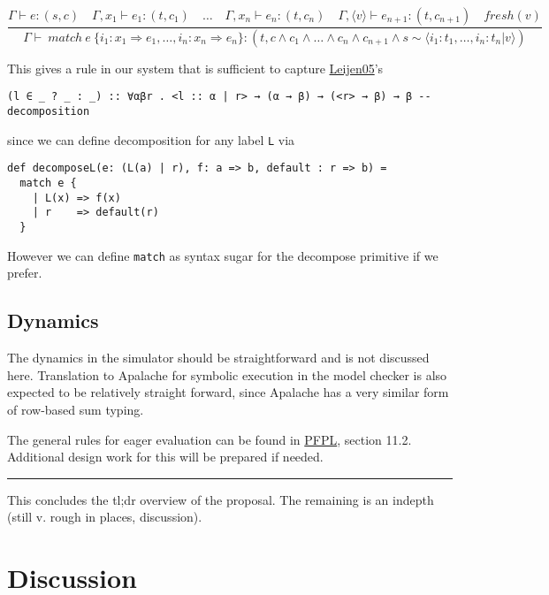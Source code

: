 \documentclass[11pt]{article}
\begin{document}
$$
\frac{
\Gamma \vdash e : (s, c) \quad
\Gamma, x_1 \vdash e_1 : (t, c_1) \quad \ldots \quad \Gamma, x_n \vdash e_n : (t, c_n) \quad
\Gamma, \langle v \rangle \vdash e_{n+1} : (t, c_{n+1}) \quad
fresh(v)
}{
\Gamma \vdash \ match \ e \ \{ i_1 : x_1 \Rightarrow e_1, \ldots, i_n : x_n \Rightarrow e_n \} : (t,
c \land c_1 \land \ldots \land c_n \land c_{n+1} \land
s \sim \langle i_1 : t_1, \ldots, i_n : t_n | v \rangle)
}
$$


This gives a rule in our system that is sufficient to capture \href{https://www.microsoft.com/en-us/research/publication/extensible-records-with-scoped-labels/}{Leijen05}'s

\begin{verbatim}
(l ∈ _ ? _ : _) :: ∀αβr . <l :: α | r> → (α → β) → (<r> → β) → β -- decomposition
\end{verbatim}

since we can define decomposition for any label \texttt{L} via

\begin{verbatim}
def decomposeL(e: (L(a) | r), f: a => b, default : r => b) = 
  match e { 
    | L(x) => f(x) 
    | r    => default(r) 
  }
\end{verbatim}

However we can define \texttt{match} as syntax sugar for the decompose
primitive if we prefer.

\subsection{Dynamics}
\label{sec:orgd77d8b6}
The dynamics in the simulator should be straightforward and is not
discussed here. Translation to Apalache for symbolic execution in the
model checker is also expected to be relatively straight forward, since
Apalache has a very similar form of row-based sum typing.

The general rules for eager evaluation can be found in
\href{https://www.cs.cmu.edu/\~rwh/pfpl.html}{PFPL}, section 11.2.
Additional design work for this will be prepared if needed.

\noindent\rule{\textwidth}{0.5pt}

This concludes the tl;dr overview of the proposal. The remaining is an
indepth (still v. rough in places, discussion).

\section{Discussion}
\label{sec:org050246d}
\end{document}
